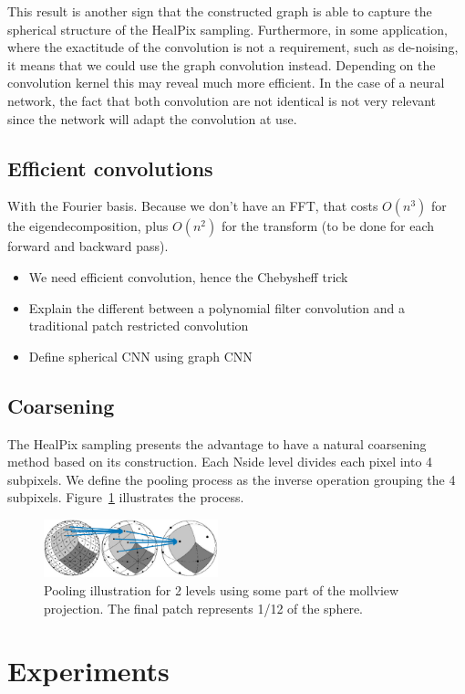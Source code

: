 \documentclass[final,twocolumn,3p,times,authoryear]{elsarticle}
\newcommand{\assign}[1]{{\color[rgb]{.8,.5,.8}{Assigned: #1 }}}
\newcommand{\figref}[1]{Figure~\ref{fig:#1}}
\newcommand{\1}{\b{1}}              %
\newcommand{\0}{\b{0}}              %
\begin{document}
This result is another sign that the constructed graph is able to capture the spherical
structure of the HealPix sampling. Furthermore, in some application, where the
exactitude of the convolution is not a requirement, such as de-noising, it means
that we could use the graph convolution instead. Depending on the convolution kernel
this may reveal much more efficient. In the case of a neural network, the fact
that both convolution are not identical is not very relevant since the network
will adapt the convolution at use.


\subsection{Efficient convolutions}
\assign{Michaël}
With the Fourier basis. Because we don't have an FFT, that costs $O(n^3)$ for the eigendecomposition, plus $O(n^2)$ for the transform (to be done for each forward and backward pass).
\begin{itemize}
	\item We need efficient convolution, hence the Chebysheff trick
	\item Explain the different between a polynomial filter convolution and a traditional patch restricted convolution
	\item Define spherical CNN using graph CNN
\end{itemize}


\subsection{Coarsening}
The HealPix sampling presents the advantage to have a natural coarsening method
based on its construction. Each Nside level divides each pixel into 4 subpixels.
We define the pooling process as the inverse operation grouping the 4 subpixels.
\figref{pooling} illustrates the process.
\begin{figure}[!ht]
\centering
\includegraphics[width=0.45\textwidth]{figures/pooling.pdf}
\caption{Pooling illustration for 2 levels using some part of the mollview projection.
The final patch represents 1/12 of the sphere.}
\label{fig:pooling}
\end{figure}


\section{Experiments}
\label{sec:experiments}
\end{document}

